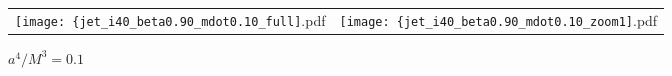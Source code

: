 \documentclass[iop]{emulateapj}
\begin{document}
\begin{figure*}
\begin{center}
  \begin{tabular}{cc}
    \texttt{[image: \{jet\_i40\_beta0.90\_mdot0.10\_full]}.pdf} &
    \texttt{[image: \{jet\_i40\_beta0.90\_mdot0.10\_zoom1]}.pdf} 
  \end{tabular}
\end{center}
\caption{$a^4/M^3=0.1$}
\label{fig:jet_mdot0.1}
\end{figure*}


\end{document}
